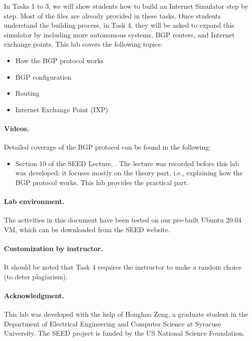 In Tasks 1 to 3, we will show students how to build 
an Internet Simulator step by step. Most of the files are 
already provided in these tasks. Once students understand
the building process, in Task 4, 
they will be asked to expand this simulator by 
including more autonomous systems, BGP routers, 
and Internet exchange points. This lab covers the following topics:
\begin{itemize}[noitemsep]
\item How the BGP protocol works
\item BGP configuration
\item Routing 
\item Internet Exchange Point (IXP)
\end{itemize}


\paragraph{Videos.}
Detailed coverage of the BGP protocol can be found in the following:

\begin{itemize}
\item Section 10 of the SEED Lecture, \seedisvideo. The lecture was recorded 
before this lab was developed; it focuses mostly on the theory
part, i.e., explaining how the BGP protocol works. 
This lab provides the practical part.  
\end{itemize}


\paragraph{Lab environment.} The activities in this document 
have been tested on our pre-built
Ubuntu 20.04 VM, which can be downloaded from the SEED website.  

\paragraph{Customization by instructor.} It should be noted that 
Task 4 requires the instructor to make a random choice (to deter
plagiarism).


\paragraph{Acknowledgment.} 
This lab was developed with the help of Honghao Zeng, a graduate student
in the Department of Electrical Engineering and Computer Science at Syracuse University.
The SEED project is funded by the US National Science Foundation. 



